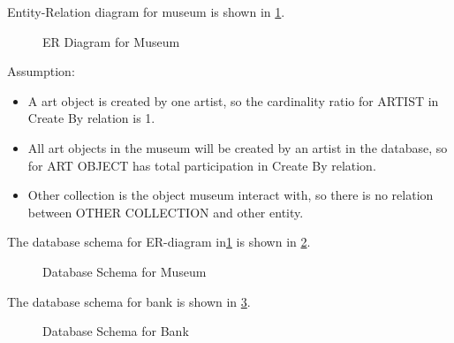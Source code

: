 \documentclass[12pt,letterpaper,titlepage,en-US]{article}
\begin{document}
\begin{homeworkProblem}
\begin{homeworkSubProblem}

Entity-Relation diagram for museum is shown in \cref{museum_er}.

\begin{figure}[!htb]
    \caption{ER Diagram for Museum}
    \label{museum_er}
\end{figure}

\pagebreak

Assumption:

\begin{itemize}
    \item A art object is created by one artist, so the cardinality ratio for ARTIST in Create By relation is 1.
    \item All art objects in the museum will be created by an artist in the database, so for ART OBJECT has total participation in Create By relation.
    \item Other collection is the object museum interact with, so there is no relation between OTHER COLLECTION and other entity.
\end{itemize}

\end{homeworkSubProblem}

\pagebreak

\begin{homeworkSubProblem}

The database schema for ER-diagram in\cref{museum_er} is shown in \cref{museum_schema}.

\begin{figure}[!htb]
\centering
  \caption{Database Schema for Museum}
  \label{museum_schema}
\end{figure}

\end{homeworkSubProblem}
\end{homeworkProblem}

\begin{homeworkProblem}

The database schema for bank is shown in \cref{bank_schema}.

\begin{figure}[!htb]
\centering
  \caption{Database Schema for Bank}
  \label{bank_schema}
\end{figure}

\end{homeworkProblem}
\end{document}
